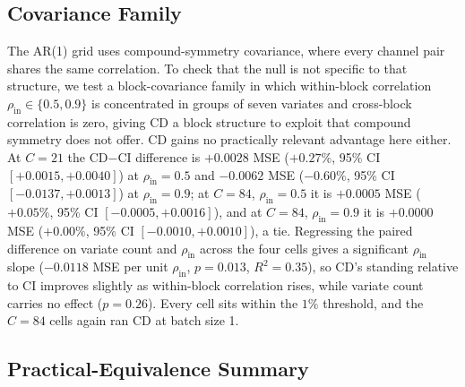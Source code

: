 \documentclass[10pt]{article} %
\begin{document}
    \subsection{Covariance Family}
    \label{subsec:blockcov}

    The AR(1) grid uses compound-symmetry covariance, where every channel pair shares the same correlation. To check that
    the null is not specific to that structure, we test a block-covariance family in which within-block correlation
    $\rho_{\text{in}} \in \{0.5, 0.9\}$ is concentrated in groups of seven variates and cross-block correlation is zero,
    giving CD a block structure to exploit that compound symmetry does not offer. CD gains no practically relevant advantage
    here either. At $C = 21$ the CD$-$CI difference is $+0.0028$ MSE ($+0.27\%$, 95\% CI $[+0.0015, +0.0040]$) at
    $\rho_{\text{in}} = 0.5$ and $-0.0062$ MSE ($-0.60\%$, 95\% CI $[-0.0137, +0.0013]$) at $\rho_{\text{in}} = 0.9$; at
    $C = 84$, $\rho_{\text{in}} = 0.5$ it is $+0.0005$ MSE ($+0.05\%$, 95\% CI $[-0.0005, +0.0016]$), and at $C = 84$,
    $\rho_{\text{in}} = 0.9$ it is $+0.0000$ MSE ($+0.00\%$, 95\% CI $[-0.0010, +0.0010]$), a tie. Regressing the paired
    difference on variate count and $\rho_{\text{in}}$ across the four cells gives a significant $\rho_{\text{in}}$ slope
    ($-0.0118$ MSE per unit $\rho_{\text{in}}$, $p = 0.013$, $R^2 = 0.35$), so CD's standing relative to CI improves
    slightly as within-block correlation rises, while variate count carries no effect ($p = 0.26$). Every cell sits within
    the $1\%$ threshold, and the $C = 84$ cells again ran CD at batch size 1.

    \subsection{Practical-Equivalence Summary}
    \label{subsec:equiv_summary}
\end{document}
